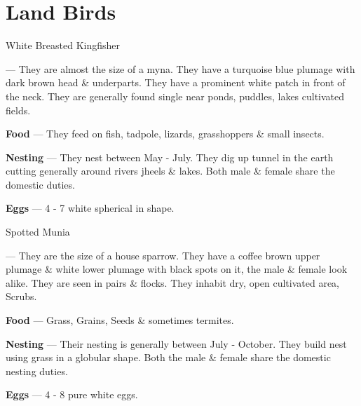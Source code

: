 \part{Land Birds}

\begin{bird}{White Breasted Kingfisher}

 --- They are almost the size of a myna. They have a turquoise blue plumage with dark brown head \& underparts. They  have a prominent white patch in front of the neck. They are generally found single near ponds, puddles, lakes cultivated fields.

{\large\bf Food} --- They feed on fish, tadpole, lizards, grasshoppers \& small insects.

{\large\bf Nesting} --- They nest between May - July. They dig up tunnel in the earth cutting generally around rivers jheels \& lakes. Both male \& female share the domestic duties.

{\large\bf Eggs} --- 4 - 7 white spherical in shape.
\end{bird}

\begin{bird}{Spotted Munia}

 --- They are the size of a house sparrow. They have a coffee brown upper plumage \& white lower plumage with black spots on it, the male \& female look alike. They are seen in pairs \& flocks. They inhabit dry, open cultivated area, Scrubs. 

{\large\bf Food} --- Grass, Grains, Seeds \& sometimes termites.

{\large\bf Nesting} --- Their nesting is generally between July - October. They build nest using grass in a globular shape. Both the male \& female share the domestic nesting duties.

{\large\bf Eggs} --- 4 - 8 pure white eggs.
\end{bird}


